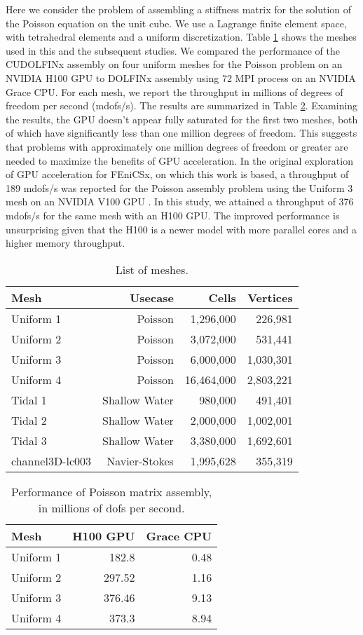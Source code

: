 Here we consider the problem of assembling a stiffness matrix for the solution of the Poisson equation on the unit cube. We use a Lagrange finite element space, with tetrahedral elements and a uniform discretization. Table \ref{tab:meshes} shows the meshes used in this and the subsequent studies. We compared the performance of the CUDOLFINx assembly on four uniform meshes for the Poisson problem on an NVIDIA H100 GPU to DOLFINx assembly using 72 MPI process on an NVIDIA Grace CPU. For each mesh, we report the throughput in millions of degrees of freedom per second (mdofs/s). The results are summarized in Table \ref{tab:poisson_results}. Examining the results, the GPU doesn't appear fully saturated for the first two meshes, both of which have significantly less than one million degrees of freedom. This suggests that problems with approximately one million degrees of freedom or greater are needed to maximize the benefits of GPU acceleration. In the original exploration of GPU acceleration for FEniCSx, on which this work is based, a throughput of 189 mdofs/s was reported for the Poisson assembly problem using the Uniform 3 mesh on an NVIDIA V100 GPU \cite{trotter2023targeting}. In this study, we attained a throughput of 376 mdofs/s for the same mesh with an H100 GPU. The improved performance is unsurprising given that the H100 is a newer model with more parallel cores and a higher memory throughput. 
\begin{table}[t]
    \centering
\begin{tabular}{lrrr}
\toprule
Mesh & Usecase & Cells & Vertices\\
\midrule
Uniform 1 & Poisson & 1,296,000 & 226,981 \\ 
Uniform 2 & Poisson & 3,072,000 & 531,441 \\ 
Uniform 3 & Poisson & 6,000,000 & 1,030,301 \\ 
Uniform 4 & Poisson & 16,464,000 & 2,803,221 \\ 
Tidal 1 & Shallow Water & 980,000 & 491,401 \\
Tidal 2 & Shallow Water & 2,000,000 & 1,002,001 \\
Tidal 3 & Shallow Water & 3,380,000 & 1,692,601 \\
channel3D-lc003 & Navier-Stokes & 1,995,628 & 355,319 \\
\bottomrule
\end{tabular}
\caption{List of meshes.}
    \label{tab:meshes}
\end{table}

\begin{table}[t]
    \centering
\begin{tabular}{lrr}
\toprule
Mesh & H100 GPU & Grace CPU \\
\midrule
Uniform 1 & 182.8 & 0.48 \\ 
Uniform 2 & 297.52 & 1.16 \\ 
Uniform 3 & 376.46 & 9.13 \\ 
Uniform 4 & 373.3 & 8.94 \\ 
\bottomrule
\end{tabular}
\caption{Performance of Poisson matrix assembly, in millions of dofs per second.}
    \label{tab:poisson_results}
\end{table}

